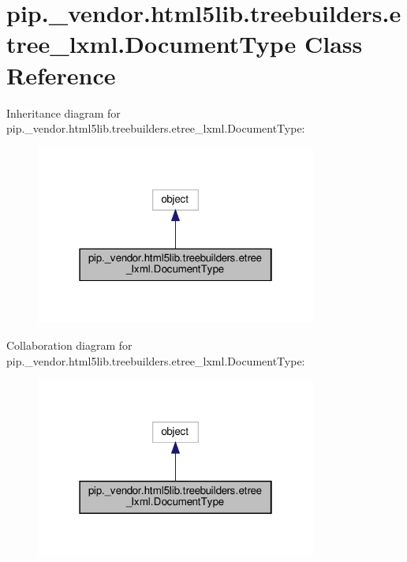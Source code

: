 \hypertarget{classpip_1_1__vendor_1_1html5lib_1_1treebuilders_1_1etree__lxml_1_1DocumentType}{}\section{pip.\+\_\+vendor.\+html5lib.\+treebuilders.\+etree\+\_\+lxml.\+Document\+Type Class Reference}
\label{classpip_1_1__vendor_1_1html5lib_1_1treebuilders_1_1etree__lxml_1_1DocumentType}


Inheritance diagram for pip.\+\_\+vendor.\+html5lib.\+treebuilders.\+etree\+\_\+lxml.\+Document\+Type\+:
\nopagebreak
\begin{figure}[H]
\begin{center}
\leavevmode
\includegraphics[width=262pt]{classpip_1_1__vendor_1_1html5lib_1_1treebuilders_1_1etree__lxml_1_1DocumentType__inherit__graph}
\end{center}
\end{figure}


Collaboration diagram for pip.\+\_\+vendor.\+html5lib.\+treebuilders.\+etree\+\_\+lxml.\+Document\+Type\+:
\nopagebreak
\begin{figure}[H]
\begin{center}
\leavevmode
\includegraphics[width=262pt]{classpip_1_1__vendor_1_1html5lib_1_1treebuilders_1_1etree__lxml_1_1DocumentType__coll__graph}
\end{center}
\end{figure}
